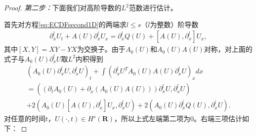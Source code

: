 \begin{proof}
\emph{第二步：}下面我们对高阶导数的$L^2$范数进行估计。

首先对方程\eqref{eq:ECDFsecond1D}的两端求$l\le s$（$l$为整数）阶导数
\begin{eqnarray*}
\partial^l_x U_t + A(U) \partial^l_x U_x = \partial^l_x Q(U) + [A(U),\partial^l_x]U_x,
\end{eqnarray*}
其中$[X,Y]=XY-YX$为交换子。由于$A_0(U)$和$A_0(U)A(U)$对称，对上面的式子与$A_0(U)\partial^l_x U$取$L^2$内积得到
\begin{multline}\label{45}
  (A_0(U)\partial^l_x U,\partial^l_x U)_t + \int (\partial^l_x U^T A_0(U)A(U)\partial^l_x U)_x dx \\
  = ((\partial_t A_0(U)+\partial_x(A_0(U)A(U)))\partial^l_x U,\partial^l_x U) \\
  + 2(A_0(U)[A(U),\partial^l_x]U_x,\partial^l_x U) + 2(A_0(U) \partial^l_x Q(U), \partial^l_x U).
\end{multline}
对任意的时间$t$，$U(\cdot, t)\in H^s(\mathbf{R})$，所以上式左端第二项为0。右端三项估计如下：


\end{proof}
